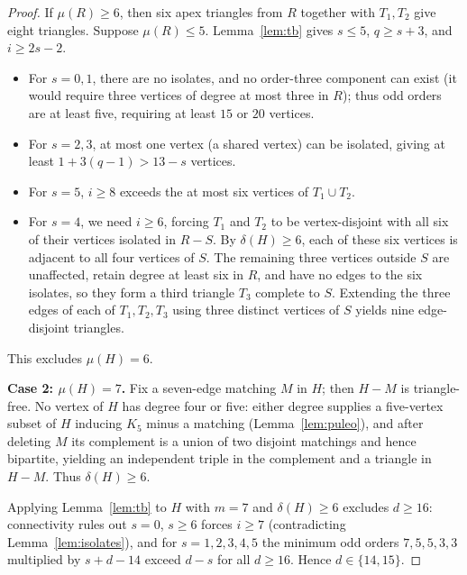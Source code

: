 \documentclass[11pt]{article}
\begin{document}
\begin{proof}
If $\mu(R)\geq 6$, then six apex triangles from $R$ together with $T_1,T_2$ give eight triangles. Suppose $\mu(R)\leq 5$. Lemma~\ref{lem:tb} gives $s\leq 5$, $q\geq s+3$, and $i\geq 2s-2$.
\begin{itemize}
\item For $s=0,1$, there are no isolates, and no order-three component can exist (it would require three vertices of degree at most three in $R$); thus odd orders are at least five, requiring at least $15$ or $20$ vertices.
\item For $s=2,3$, at most one vertex (a shared vertex) can be isolated, giving at least $1+3(q-1)>13-s$ vertices.
\item For $s=5$, $i\geq 8$ exceeds the at most six vertices of $T_1\cup T_2$.
\item For $s=4$, we need $i\geq 6$, forcing $T_1$ and $T_2$ to be vertex-disjoint with all six of their vertices isolated in $R-S$. By $\delta(H)\geq 6$, each of these six vertices is adjacent to all four vertices of $S$. The remaining three vertices outside $S$ are unaffected, retain degree at least six in $R$, and have no edges to the six isolates, so they form a third triangle $T_3$ complete to $S$. Extending the three edges of each of $T_1,T_2,T_3$ using three distinct vertices of $S$ yields nine edge-disjoint triangles.
\end{itemize}
This excludes $\mu(H)=6$.

\medskip
\noindent\textbf{Case 2: $\mu(H)=7$.}
Fix a seven-edge matching $M$ in $H$; then $H-M$ is triangle-free. No vertex of $H$ has degree four or five: either degree supplies a five-vertex subset of $H$ inducing $K_5$ minus a matching (Lemma~\ref{lem:puleo}), and after deleting $M$ its complement is a union of two disjoint matchings and hence bipartite, yielding an independent triple in the complement and a triangle in $H-M$. Thus $\delta(H)\geq 6$.

Applying Lemma~\ref{lem:tb} to $H$ with $m=7$ and $\delta(H)\geq 6$ excludes $d\geq 16$: connectivity rules out $s=0$, $s\geq 6$ forces $i\geq 7$ (contradicting Lemma~\ref{lem:isolates}), and for $s=1,2,3,4,5$ the minimum odd orders $7,5,5,3,3$ multiplied by $s+d-14$ exceed $d-s$ for all $d\geq 16$. Hence $d\in\{14,15\}$.


\end{proof}
\end{document}
